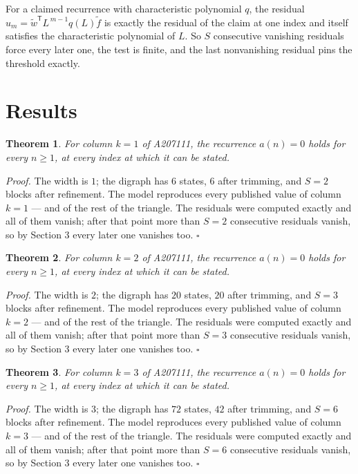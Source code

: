 \documentclass[11pt]{article}
\newtheorem{theorem}{Theorem}
\theoremstyle{definition}
\begin{document}
For a claimed recurrence with characteristic polynomial $q$, the residual $u_m = \tilde w^{\mathsf T}L^{\,m-1}q(L)\tilde f$ is exactly the residual of the claim at one index and itself satisfies the characteristic polynomial of $L$. So $S$ consecutive vanishing residuals force every later one, the test is finite, and the last nonvanishing residual pins the threshold exactly.

\section{Results}

\begin{theorem} For column $k = 1$ of A207111, the recurrence $a(n) = 0$ holds for every $n \ge 1$, at every index at which it can be stated.\end{theorem}

{\itshape Proof.} The width is $1$; the digraph has $6$ states, $6$ after trimming, and $S = 2$ blocks after refinement. The model reproduces every published value of column $k = 1$ --- and of the rest of the triangle. The residuals were computed exactly and all of them vanish; after that point more than $S = 2$ consecutive residuals vanish, so by Section 3 every later one vanishes too. $\square$

\begin{theorem} For column $k = 2$ of A207111, the recurrence $a(n) = 0$ holds for every $n \ge 1$, at every index at which it can be stated.\end{theorem}

{\itshape Proof.} The width is $2$; the digraph has $20$ states, $20$ after trimming, and $S = 3$ blocks after refinement. The model reproduces every published value of column $k = 2$ --- and of the rest of the triangle. The residuals were computed exactly and all of them vanish; after that point more than $S = 3$ consecutive residuals vanish, so by Section 3 every later one vanishes too. $\square$

\begin{theorem} For column $k = 3$ of A207111, the recurrence $a(n) = 0$ holds for every $n \ge 1$, at every index at which it can be stated.\end{theorem}

{\itshape Proof.} The width is $3$; the digraph has $72$ states, $42$ after trimming, and $S = 6$ blocks after refinement. The model reproduces every published value of column $k = 3$ --- and of the rest of the triangle. The residuals were computed exactly and all of them vanish; after that point more than $S = 6$ consecutive residuals vanish, so by Section 3 every later one vanishes too. $\square$
\end{document}

